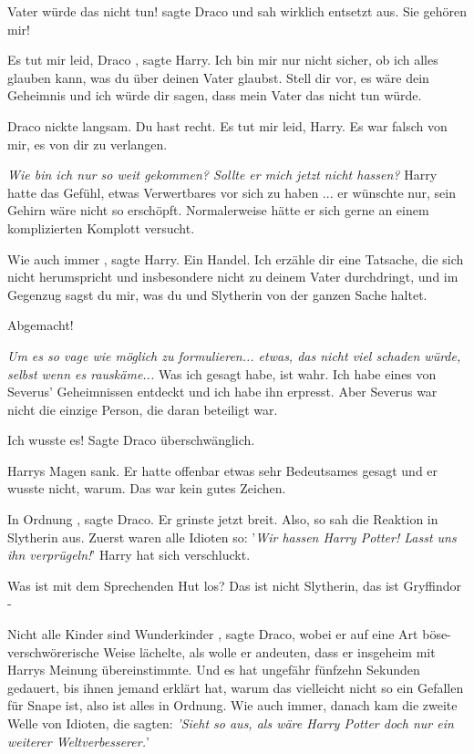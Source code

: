 \glqq Vater würde das nicht tun!\grqq{} sagte Draco und sah wirklich entsetzt
aus. \glqq Sie gehören mir!\grqq{}

\glqq Es tut mir leid, Draco\grqq{} , sagte Harry. \glqq Ich bin mir nur nicht
sicher, ob ich alles glauben kann, was du über deinen Vater glaubst. Stell dir
vor, es wäre dein Geheimnis und ich würde dir sagen, dass mein Vater das nicht
tun würde.\grqq{}

Draco nickte langsam. \glqq Du hast recht. Es tut mir leid, Harry. Es war falsch
von mir, es von dir zu verlangen.\grqq{}

\emph{ Wie bin ich nur so weit gekommen? Sollte er mich jetzt nicht hassen?}
Harry hatte das Gefühl, etwas Verwertbares vor sich zu haben ... er wünschte
nur, sein Gehirn wäre nicht so erschöpft. Normalerweise hätte er sich gerne an
einem komplizierten Komplott versucht.

\glqq Wie auch immer\grqq{} , sagte Harry. \glqq Ein Handel. Ich erzähle dir
eine Tatsache, die sich nicht herumspricht und insbesondere nicht zu deinem
Vater durchdringt, und im Gegenzug sagst du mir, was du und Slytherin von der
ganzen Sache haltet.\grqq{}

\glqq Abgemacht!\grqq{}

\emph{Um es so vage wie möglich zu formulieren... etwas, das nicht viel schaden
würde, selbst wenn es rauskäme...} \glqq Was ich gesagt habe, ist wahr. Ich habe
eines von Severus' Geheimnissen entdeckt und ich habe ihn erpresst. Aber Severus
war nicht die einzige Person, die daran beteiligt war.\grqq{}

\glqq Ich wusste es!\grqq{} Sagte Draco überschwänglich.

Harrys Magen sank. Er hatte offenbar etwas sehr Bedeutsames gesagt und er wusste
nicht, warum. Das war kein gutes Zeichen.

\glqq In Ordnung\grqq{} , sagte Draco. Er grinste jetzt breit. \glqq Also, so
sah die Reaktion in Slytherin aus. Zuerst waren alle Idioten so: '\emph{Wir
hassen Harry Potter! Lasst uns ihn verprügeln!}'\grqq{} Harry hat sich
verschluckt.

\glqq Was ist mit dem Sprechenden Hut los? Das ist nicht Slytherin, das ist
Gryffindor -\grqq{}

\glqq Nicht alle Kinder sind Wunderkinder\grqq{} , sagte Draco, wobei er auf
eine Art böse-verschwörerische Weise lächelte, als wolle er andeuten, dass er
insgeheim mit Harrys Meinung übereinstimmte. \glqq Und es hat ungefähr fünfzehn
Sekunden gedauert, bis ihnen jemand erklärt hat, warum das vielleicht nicht so
ein Gefallen für Snape ist, also ist alles in Ordnung. Wie auch immer, danach
kam die zweite Welle von Idioten, die sagten: \emph{'Sieht so aus, als wäre
Harry Potter doch nur ein weiterer Weltverbesserer.}'\grqq{}

